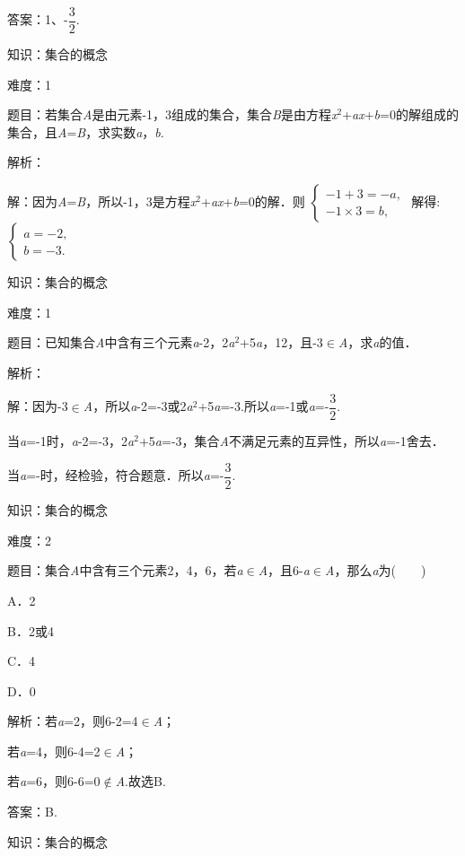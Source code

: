\documentclass{article} %
\begin{document}
答案：1、-$\dfrac{3}{2}$.

知识：集合的概念

难度：1

题目：若集合\textit{A}是由元素-1，3组成的集合，集合\textit{B}是由方程\textit{x}${}^{2}$+\textit{ax}+\textit{b}=0的解组成的集合，且\textit{A}=\textit{B}，求实数\textit{a}，\textit{b}.

解析：

解：因为\textit{A}=\textit{B}，所以-1，3是方程\textit{x}${}^{2}$+\textit{ax}+\textit{b}=0的解．则
$\left\{
\begin{array}{l}
	-1+3=-a,\\
    -1\times 3=b,
\end{array}
\right.$
解得:
$\left\{
\begin{array}{l}
	a=-2,\\
	b=-3.
\end{array}
\right.$

知识：集合的概念

难度：1

题目：已知集合\textit{A}中含有三个元素\textit{a}-2，2\textit{a}${}^{2}$+5\textit{a}，12，且-3$\mathrm{\in}$\textit{A}，求\textit{a}的值．

解析：

解：因为-3$\mathrm{\in}$\textit{A}，所以\textit{a}-2=-3或2\textit{a}${}^{2}$+5\textit{a}=-3.所以\textit{a}=-1或\textit{a}=-$\dfrac{3}{2}$.

当\textit{a}=-1时，\textit{a}-2=-3，2\textit{a}${}^{2}$+5\textit{a}=-3，集合\textit{A}不满足元素的互异性，所以\textit{a}=-1舍去．

当\textit{a}=-时，经检验，符合题意．所以\textit{a}=-$\dfrac{3}{2}$.

知识：集合的概念

难度：2

题目：集合\textit{A}中含有三个元素2，4，6，若\textit{a}$\mathrm{\in}$\textit{A}，且6-\textit{a}$\mathrm{\in}$\textit{A}，那么\textit{a}为(　　)

A．2  

B．2或4  

C．4  

D．0

解析：若\textit{a}=2，则6-2=4$\mathrm{\in}$\textit{A}；

若\textit{a}=4，则6-4=2$\mathrm{\in}$\textit{A}；

若\textit{a}=6，则6-6=0$\mathrm{\notin}$\textit{A}.故选B.

答案：B.

知识：集合的概念
\end{document}
